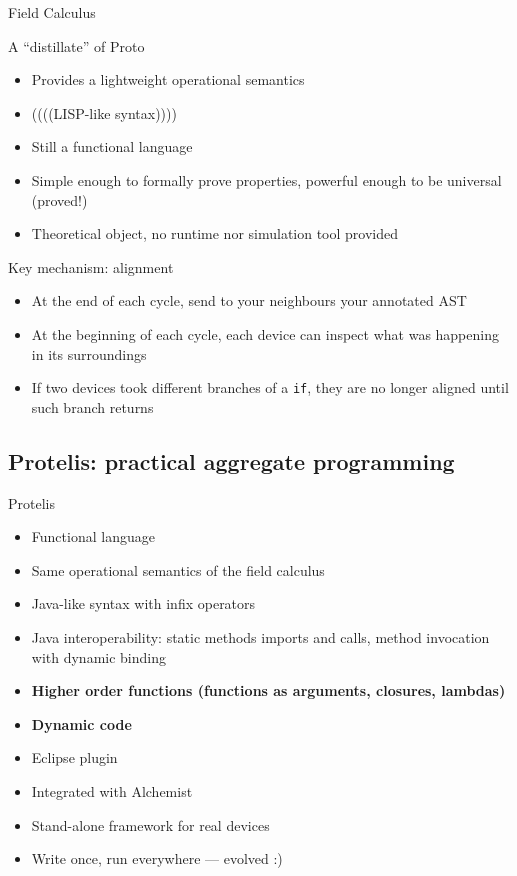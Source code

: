 \documentclass[presentation]{beamer}\mode<presentation>{\usetheme{sapere}}
\begin{document}
\begin{frame}[fragile]{Field Calculus}
  \begin{block} {A ``distillate'' of Proto}
   \begin{itemize}
    \item Provides a lightweight operational semantics \cite{VDB-FOCLASA-CIC2013}
    \item ((((LISP-like syntax))))
    \item Still a functional language
    \item Simple enough to formally prove properties, powerful enough to be universal (proved!)
    \item Theoretical object, no runtime nor simulation tool provided
   \end{itemize}
  \end{block}
  \begin{block} {Key mechanism: alignment}
   \begin{itemize}
    \item At the end of each cycle, send to your neighbours your annotated AST
    \item At the beginning of each cycle, each device can inspect what was happening in its surroundings
    \item If two devices took different branches of a \texttt{if}, they are no longer aligned until such branch returns
   \end{itemize}
  \end{block}
\end{frame}

\subsection{Protelis: practical aggregate programming}

\begin{frame}{Protelis}
  \begin{block} {}
   \begin{itemize}
    \item Functional language
    \item Same operational semantics of the field calculus 
    \item Java-like syntax with infix operators
    \item Java interoperability: static methods imports and calls, method invocation with dynamic binding
    \item \textbf{Higher order functions (functions as arguments, closures, lambdas)}
    \item \textbf{Dynamic code}
    \item Eclipse plugin
    \item Integrated with Alchemist
    \item Stand-alone framework for real devices
    \item Write once, run everywhere --- evolved :)
   \end{itemize}
  \end{block}
\end{frame}
\end{document}
